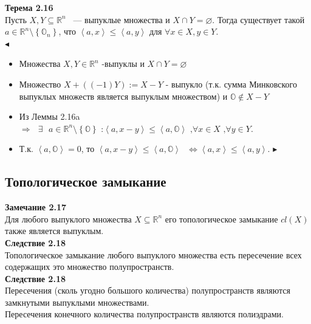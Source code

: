 \noindent\textbf{Терема 2.16}\\
Пусть $X, Y\subseteq \mathbb{R}^n$ ~--- выпуклые множества и $X \cap Y = \varnothing$. Тогда существует такой $a\in\mathbb{R}^n\setminus \left \{ \mathbb{O}_n \right \}$, что \textbf{$\left \langle a,x \right \rangle \leq \left \langle a,y \right \rangle$} для $\forall x\in X, y \in Y$.\\
$\blacktriangleleft$
\begin{itemize}
\item Множества $X,Y \in \mathbb{R}^{n}$ -выпуклы и $X\cap Y = \varnothing$
\item Множество $X + \left( (-1) Y\right):=X-Y$ - выпукло (т.к. сумма Минковского выпуклых множеств является выпуклым множеством) и $\mathbb{O} \notin X-Y$
\item Из Леммы 2.16a $\Longrightarrow \text{ } \exists \text{ } a \in \mathbb{R}^{n} \setminus \left\lbrace \mathbb{O} \right\rbrace \text{ :} \left\langle a, x-y \right\rangle \leq \left\langle a, \mathbb{O}  \right\rangle \text{ ,} \forall x \in X \text{ ,} \forall y \in Y$.
\item Т.к. $ \left\langle a, \mathbb{O}  \right\rangle = 0$, то  $\left\langle a, x-y \right\rangle \leq \left\langle a, \mathbb{O}  \right\rangle \text{ } \Longleftrightarrow \left \langle a,x \right \rangle \leq \left \langle a,y \right \rangle$. $\blacktriangleright$
\end{itemize}
\subsection{Топологическое замыкание}
\textbf{Замечание 2.17}\\
Для любого выпуклого множества $X \subseteq \mathbb{R}^n$ его топологическое замыкание  $cl(X)$ также является выпуклым.\\

\noindent\textbf{Следствие 2.18}\\
Топологическое замыкание любого выпуклого множества есть пересечение всех содержащих это множество полупространств.\\

\noindent\textbf{Следствие 2.18}\\
Пересечения (сколь угодно большого количества) полупространств являются замкнутыми выпуклыми множествами.\\
Пересечения конечного количества полупространств являются полиэдрами. 